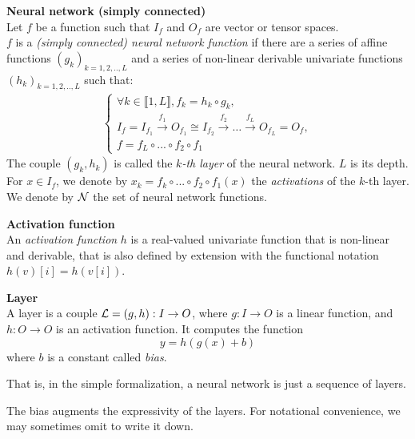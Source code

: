 \begin{definition}\textbf{Neural network (simply connected)}\\
Let $f$ be a function such that $I_f$ and $O_f$ are vector or tensor spaces.\\
$f$ is a \emph{(simply connected) neural network function} if there are a series of affine functions $(g_k)_{k=1,2,..,L}$ and a series of non-linear derivable univariate functions $(h_k)_{k=1,2,..,L}$ such that:
\begin{gather*}
\left\{
  \begin{array}{l}
    \forall k \in \llbracket 1, L \rrbracket, f_k = h_k \circ g_k, \\
    I_f = I_{f_1} \xrightarrow{f_1} O_{f_1} \cong I_{f_2} \xrightarrow{f_2} \dots \xrightarrow{f_L} O_{f_L} = O_f, \\
    f = f_{L} \circ ... \circ f_{2} \circ f_1
  \end{array}
\right.
\end{gather*}
The couple $(g_k, h_k)$ is called the \emph{$k$-th layer} of the neural network. $L$ is its depth.
For $x \in I_f$, we denote by $x_k = f_k \circ ... \circ f_{2} \circ f_1 (x)$ the \emph{activations} of the $k$-th layer. We denote by $\mathcal{N}$ the set of neural network functions.
\label{def:nn}
\end{definition}

\begin{definition}\textbf{Activation function}\\
An \emph{activation function} $h$ is a real-valued univariate function that is non-linear and derivable, that is also defined by extension with the functional notation $h(v)[i] = h(v[i])$.
\end{definition}

\begin{definition}\textbf{Layer}\\
A layer is a couple $\mathcal{L} = (g,h) : I \to O$, where $g : I \to O$ is a linear function, and $h: O \to O$ is an activation function. It computes the function
$$
y = h(g(x) + b)
$$
where $b$ is a constant called \emph{bias}.
\end{definition}

That is, in the simple formalization, a neural network is just a sequence of layers.

\begin{remark}The bias augments the expressivity of the layers. For notational convenience, we may sometimes omit to write it down.
\end{remark}

